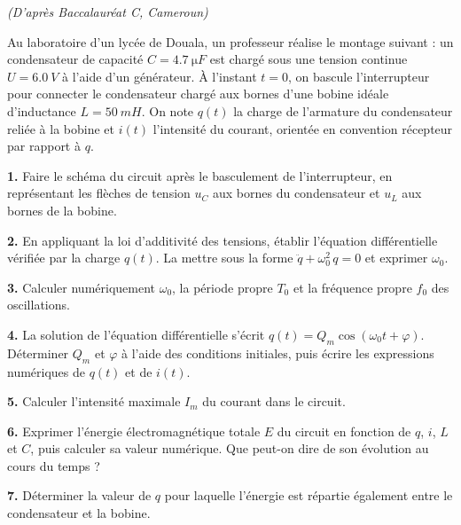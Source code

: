 \documentclass[11pt]{article}
\begin{document}
\begin{exercice}
\textit{(D'après Baccalauréat C, Cameroun)}

Au laboratoire d'un lycée de Douala, un professeur réalise le montage suivant : un condensateur de capacité $C = \SI{4,7}{\micro F}$ est chargé sous une tension continue $U = \SI{6,0}{V}$ à l'aide d'un générateur. À l'instant $t = 0$, on bascule l'interrupteur pour connecter le condensateur chargé aux bornes d'une bobine idéale d'inductance $L = \SI{50}{mH}$. On note $q(t)$ la charge de l'armature du condensateur reliée à la bobine et $i(t)$ l'intensité du courant, orientée en convention récepteur par rapport à $q$.

\textbf{1.} Faire le schéma du circuit après le basculement de l'interrupteur, en représentant les flèches de tension $u_C$ aux bornes du condensateur et $u_L$ aux bornes de la bobine.

\textbf{2.} En appliquant la loi d'additivité des tensions, établir l'équation différentielle vérifiée par la charge $q(t)$. La mettre sous la forme $\ddot{q} + \omega_0^2\,q = 0$ et exprimer $\omega_0$.

\textbf{3.} Calculer numériquement $\omega_0$, la période propre $T_0$ et la fréquence propre $f_0$ des oscillations.

\textbf{4.} La solution de l'équation différentielle s'écrit $q(t) = Q_m\cos(\omega_0 t + \varphi)$. Déterminer $Q_m$ et $\varphi$ à l'aide des conditions initiales, puis écrire les expressions numériques de $q(t)$ et de $i(t)$.

\textbf{5.} Calculer l'intensité maximale $I_m$ du courant dans le circuit.

\textbf{6.} Exprimer l'énergie électromagnétique totale $E$ du circuit en fonction de $q$, $i$, $L$ et $C$, puis calculer sa valeur numérique. Que peut-on dire de son évolution au cours du temps ?

\textbf{7.} Déterminer la valeur de $q$ pour laquelle l'énergie est répartie également entre le condensateur et la bobine.
\end{exercice}
\end{document}
